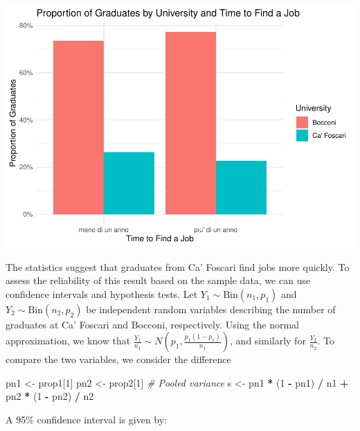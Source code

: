 \documentclass[
]{article}
\newenvironment{Shaded}{\begin{snugshade}}{\end{snugshade}}
\newcommand{\CommentTok}[1]{\textcolor[rgb]{0.56,0.35,0.01}{\textit{#1}}}
\newcommand{\DecValTok}[1]{\textcolor[rgb]{0.00,0.00,0.81}{#1}}
\newcommand{\NormalTok}[1]{#1}
\newcommand{\OtherTok}[1]{\textcolor[rgb]{0.56,0.35,0.01}{#1}}
\newcommand{\SpecialCharTok}[1]{\textcolor[rgb]{0.81,0.36,0.00}{\textbf{#1}}}
\begin{document}
\includegraphics{Hypothesis_Testing_files/figure-latex/unnamed-chunk-44-1.pdf}

The statistics suggest that graduates from Ca' Foscari find jobs more
quickly. To assess the reliability of this result based on the sample
data, we can use confidence intervals and hypothesis tests. Let
\(Y_1 \sim \text{Bin}(n_1, p_1)\) and \(Y_2 \sim \text{Bin}(n_2, p_2)\)
be independent random variables describing the number of graduates at
Ca' Foscari and Bocconi, respectively. Using the normal approximation,
we know that \(\frac{Y_1}{n_1} \sim N(p_1, \frac{p_1(1-p_1)}{n_1})\),
and similarly for \(\frac{Y_2}{n_2}\). To compare the two variables, we
consider the difference

\begin{Shaded}
\begin{Highlighting}[]
\NormalTok{pn1 }\OtherTok{\textless{}{-}}\NormalTok{ prop1[}\DecValTok{1}\NormalTok{]}
\NormalTok{pn2 }\OtherTok{\textless{}{-}}\NormalTok{ prop2[}\DecValTok{1}\NormalTok{]}
\CommentTok{\# Pooled variance}
\NormalTok{s }\OtherTok{\textless{}{-}}\NormalTok{ pn1 }\SpecialCharTok{*}\NormalTok{ (}\DecValTok{1} \SpecialCharTok{{-}}\NormalTok{ pn1) }\SpecialCharTok{/}\NormalTok{ n1 }\SpecialCharTok{+}\NormalTok{ pn2 }\SpecialCharTok{*}\NormalTok{ (}\DecValTok{1} \SpecialCharTok{{-}}\NormalTok{ pn2) }\SpecialCharTok{/}\NormalTok{ n2}
\end{Highlighting}
\end{Shaded}

A 95\% confidence interval is given by:
\end{document}
